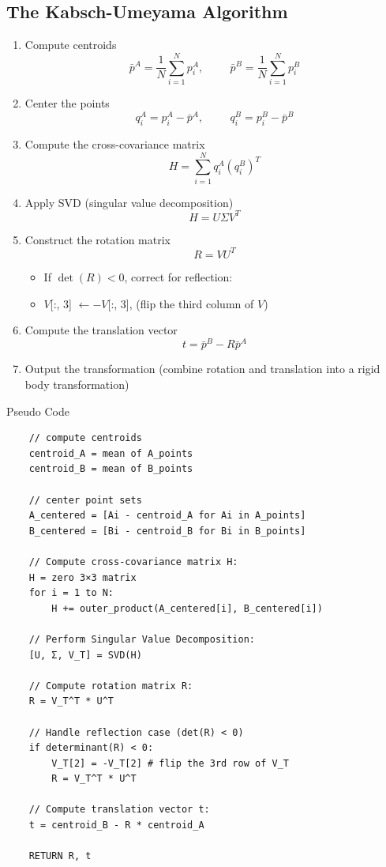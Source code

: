 \documentclass[10pt]{article}
\begin{document}
\subsection*{The Kabsch-Umeyama Algorithm}
\begin{enumerate}
    \item Compute centroids
    \[\bar{p}^A = \frac{1}{N} \sum_{i = 1}^N p_i^A,\hspace{1cm} \bar{p}^B = \frac{1}{N} \sum_{i = 1}^N p_i^B\]
    \item Center the points
    \[q_i^A = p_i^A - \bar{p}^A, \hspace{1cm} q_i^B = p_i^B - \bar{p}^B\]
    \item Compute the cross-covariance matrix
    \[H = \sum_{i = 1}^N q_i^A(q_i^B)^T\]
    \item Apply SVD (singular value decomposition)
    \[H = U\Sigma V^T\]
    \item Construct the rotation matrix
    \[R = VU^T\]
    \begin{itemize}
        \item If $\det(R) < 0$, correct for reflection:
        \item $V$[:, 3] $\leftarrow -V$[:, 3], (flip the third column of $V$)
    \end{itemize}
    \item Compute the translation vector
    \[t = \bar{p}^B - R \bar{p}^A\]
    \item Output the transformation (combine rotation and translation into a rigid body transformation)
\end{enumerate}
Pseudo Code
\begin{verbatim}
    // compute centroids
    centroid_A = mean of A_points
    centroid_B = mean of B_points

    // center point sets
    A_centered = [Ai - centroid_A for Ai in A_points]
    B_centered = [Bi - centroid_B for Bi in B_points]

    // Compute cross-covariance matrix H:
    H = zero 3×3 matrix
    for i = 1 to N:
        H += outer_product(A_centered[i], B_centered[i])

    // Perform Singular Value Decomposition:
    [U, Σ, V_T] = SVD(H)

    // Compute rotation matrix R:
    R = V_T^T * U^T

    // Handle reflection case (det(R) < 0)
    if determinant(R) < 0:
        V_T[2] = -V_T[2] # flip the 3rd row of V_T
        R = V_T^T * U^T
    
    // Compute translation vector t:
    t = centroid_B - R * centroid_A
    
    RETURN R, t
\end{verbatim}
\end{document}
